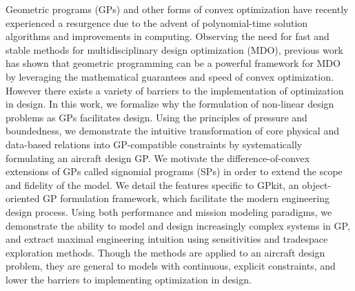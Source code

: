 % 
% 
%


Geometric programs (GPs) and other forms of convex optimization have recently experienced
a resurgence due to the advent of polynomial-time solution algorithms and improvements in computing.
Observing the need for fast and stable methods for multidisciplinary
design optimization (MDO),
previous work has shown that geometric programming can be a powerful framework
for MDO by leveraging the mathematical guarantees
and speed of convex optimization. However there exists a variety of barriers to
the implementation of optimization in design.
In this work, we formalize why the formulation
of non-linear design problems as GPs facilitates design.
Using the principles of pressure and boundedness,
we demonstrate the intuitive transformation of core physical and
data-based relations into GP-compatible constraints by systematically formulating an aircraft
design GP. We motivate the difference-of-convex extensions of GPs called signomial programs (SPs)
in order to extend the scope and fidelity of the model.
We detail the features specific to GPkit, an object-oriented GP formulation framework, which
facilitate the modern engineering design process.
Using both performance and mission modeling paradigms, we demonstrate the ability to
model and design increasingly complex systems in GP, and extract maximal engineering intuition
using sensitivities and tradespace exploration methods.
Though the methods are applied to an aircraft design problem, they are general to
models with continuous, explicit constraints, and lower the barriers to implementing
optimization in design.

